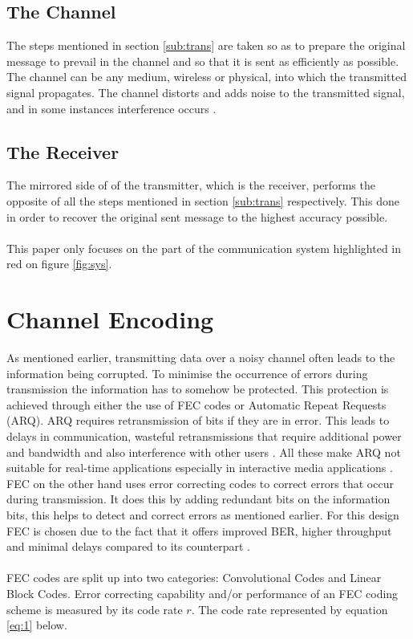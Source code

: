 \documentclass[11pt]{report}
\begin{document}
\subsection{The Channel}
The steps mentioned in section \ref{sub:trans} are taken so as to  prepare the original message to prevail in the channel and so that it is sent as efficiently as possible. The channel can be any medium, wireless or physical, into which the transmitted signal propagates. The channel distorts and adds noise to the transmitted signal, and in some instances interference occurs \cite{B10}. 

\subsection{The Receiver}
The mirrored side of of the transmitter, which is the receiver, performs the opposite of all the steps mentioned in section \ref{sub:trans} respectively. This done in order to recover the original sent message to the highest accuracy possible. 
\\
\\
This paper only focuses on the part of the communication system highlighted in red on figure \ref{fig:sys}.

\section{Channel Encoding}
As mentioned earlier, transmitting data over a noisy channel often leads to the information being corrupted. To minimise the occurrence of errors during transmission the information has to somehow be protected. This protection is achieved through either the use of FEC codes or Automatic Repeat Requests (ARQ). ARQ requires retransmission of bits if they are in error. This leads to delays in communication, wasteful retransmissions that require additional power and bandwidth and also interference with other users \cite{B11}. All these make ARQ not suitable for real-time applications especially in interactive media applications \cite{51}. FEC on the other hand uses error correcting codes to correct errors that occur during transmission. It does this by adding redundant bits on the information bits, this helps to detect and correct errors as mentioned earlier. For this design FEC is chosen due to the fact that it offers improved BER, higher throughput and minimal delays compared to its counterpart \cite{51,52}.
\\
\\
FEC codes are split up into two categories: Convolutional Codes and Linear Block Codes. Error correcting capability and/or performance of an FEC coding scheme is measured by its code rate $r$. The code rate represented by equation \ref{eq:1} below.
\end{document}
